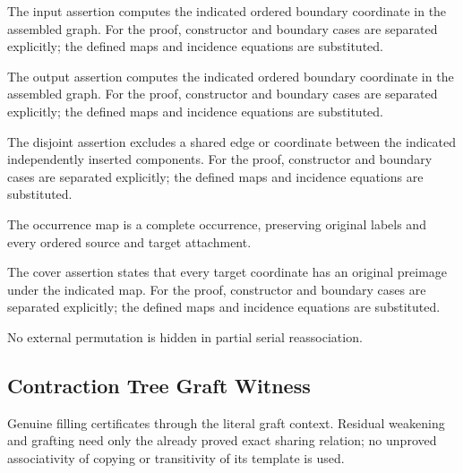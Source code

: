 The input assertion computes the indicated ordered boundary coordinate in the assembled graph.
For the proof, constructor and boundary cases are separated explicitly; the defined maps and incidence equations are substituted.
\par{}

The output assertion computes the indicated ordered boundary coordinate in the assembled graph.
For the proof, constructor and boundary cases are separated explicitly; the defined maps and incidence equations are substituted.
\par{}

The disjoint assertion excludes a shared edge or coordinate between the indicated independently inserted components.
For the proof, constructor and boundary cases are separated explicitly; the defined maps and incidence equations are substituted.
\par{}

The occurrence map is a complete occurrence, preserving original labels and every ordered source and target attachment.
\par{}

The cover assertion states that every target coordinate has an original preimage under the indicated map.
For the proof, constructor and boundary cases are separated explicitly; the defined maps and incidence equations are substituted.
\par{}

No external permutation is hidden in partial serial reassociation.
\par{}

\subsection{Contraction Tree Graft Witness}
Genuine filling certificates through the literal graft context. Residual weakening and grafting need only the already proved exact sharing relation; no unproved associativity of copying or transitivity of its template is used.

